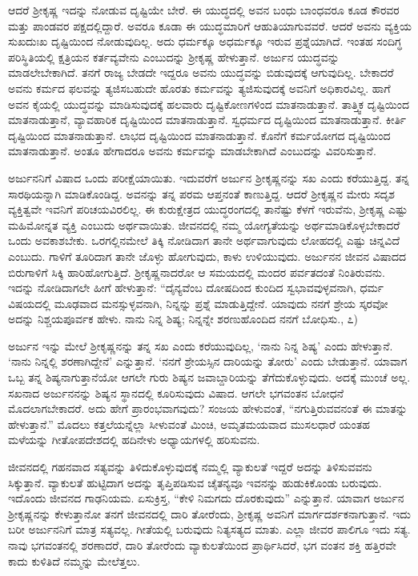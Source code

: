 ಆದರೆ ಶ‍್ರೀಕೃಷ್ಣ ಇದನ್ನು ನೋಡುವ ದೃಷ್ಟಿಯೇ ಬೇರೆ. ಈ ಯುದ್ಧದಲ್ಲಿ ಅವನ ಬಂಧು ಬಾಂಧವರೂ ಕೂಡ ಕೌರವರ ಮತ್ತು ಪಾಂಡವರ ಪಕ್ಷದಲ್ಲಿದ್ದಾರೆ. ಅವರೂ ಕೂಡಾ ಈ ಯುದ್ಧಮಾರಿಗೆ ಆಹುತಿಯಾಗುವವರೆ. ಆದರೆ ಅವನು ವ್ಯಕ್ತಿಯ ಸುಖದುಃಖ ದೃಷ್ಟಿಯಿಂದ ನೋಡುವುದಿಲ್ಲ. ಅದು ಧರ್ಮಕ್ಕೂ ಅಧರ್ಮಕ್ಕೂ ಇರುವ ಪ್ರಶ್ನೆಯಾಗಿದೆ. ಇಂತಹ ಸಂದಿಗ್ಧ ಪರಿಸ್ಥಿತಿಯಲ್ಲಿ ಕ್ಷತ್ರಿಯನ ಕರ್ತವ್ಯವೇನು ಎಂಬುದನ್ನು ಶ‍್ರೀಕೃಷ್ಣ ಹೇಳುತ್ತಾನೆ. ಅರ್ಜುನ ಯುದ್ಧವನ್ನು ಮಾಡಲೇಬೇಕಾಗಿದೆ. ತನಗೆ ರಾಜ್ಯ ಬೇಡದೇ ಇದ್ದರೂ ಅವನು ಯುದ್ಧವನ್ನು ಬಿಡುವುದಕ್ಕೆ ಆಗುವುದಿಲ್ಲ. ಬೇಕಾದರೆ ಅವನು ಕರ್ಮದ ಫಲವನ್ನು ತ್ಯಜಿಸಬಹುದೇ ಹೊರತು ಕರ್ಮವನ್ನು ತ್ಯಜಿಸುವುದಕ್ಕೆ ಅವನಿಗೆ ಅಧಿಕಾರವಿಲ್ಲ. ಹಾಗೆ ಅವನ ಕೈಯಲ್ಲಿ ಯುದ್ಧವನ್ನು ಮಾಡಿಸುವುದಕ್ಕೆ ಹಲವಾರು ದೃಷ್ಟಿಕೋಣಗಳಿಂದ ಮಾತನಾಡುತ್ತಾನೆ. ತಾತ್ತ್ವಿಕ ದೃಷ್ಟಿಯಿಂದ ಮಾತನಾಡುತ್ತಾನೆ, ವ್ಯಾವಹಾರಿಕ ದೃಷ್ಟಿಯಿಂದ ಮಾತನಾಡುತ್ತಾನೆ. ಸ್ವಧರ್ಮದ ದೃಷ್ಟಿಯಿಂದ ಮಾತನಾಡುತ್ತಾನೆ. ಕೀರ್ತಿ ದೃಷ್ಟಿಯಿಂದ ಮಾತನಾಡುತ್ತಾನೆ. ಲಾಭದ ದೃಷ್ಟಿಯಿಂದ ಮಾತನಾಡುತ್ತಾನೆ. ಕೊನೆಗೆ ಕರ್ಮಯೋಗದ ದೃಷ್ಟಿಯಿಂದ ಮಾತನಾಡುತ್ತಾನೆ. ಅಂತೂ ಹೇಗಾದರೂ ಅವನು ಕರ್ಮವನ್ನು ಮಾಡಬೇಕಾಗಿದೆ ಎಂಬುದನ್ನು ವಿವರಿಸುತ್ತಾನೆ.

ಅರ್ಜುನನಿಗೆ ವಿಷಾದ ಒಂದು ಪರೀಕ್ಷೆಯಾಯಿತು. ಇದುವರೆಗೆ ಅರ್ಜುನ ಶ‍್ರೀಕೃಷ್ಣನನ್ನು ಸಖ ಎಂದು ಕರೆಯುತ್ತಿದ್ದ. ತನ್ನ ಸಾರಥಿಯನ್ನಾಗಿ ಮಾಡಿಕೊಂಡಿದ್ದ. ಅವನನ್ನು ತನ್ನ ಪರಮ ಆಪ್ತನಂತೆ ಕಾಣುತ್ತಿದ್ದ. ಆದರೆ ಶ‍್ರೀಕೃಷ್ಣನ ಮೇರು ಸದೃಶ ವ್ಯಕ್ತಿತ್ವವೇ ಇವನಿಗೆ ಪರಿಚಯವಿರಲಿಲ್ಲ. ಈ ಕುರುಕ್ಷೇತ್ರದ ಯುದ್ಧರಂಗದಲ್ಲಿ ತಾನೆಷ್ಟು ಕೆಳಗೆ ಇರುವೆನು, ಶ‍್ರೀಕೃಷ್ಣ ಎಷ್ಟು ಮಹಿಮೋನ್ನತ ವ್ಯಕ್ತಿ ಎಂಬುದು ಅರ್ಥವಾಯಿತು. ಜೀವನದಲ್ಲಿ ನಮ್ಮ ಯೋಗ್ಯತೆಯನ್ನು ಅರ್ಥಮಾಡಿಕೊಳ್ಳಬೇಕಾದರೆ ಒಂದು ಅವಕಾಶಬೇಕು. ಒರಗಲ್ಲಿನಮೇಲೆ ತಿಕ್ಕಿ ನೋಡಿದಾಗ ತಾನೇ ಅರ್ಥವಾಗುವುದು ಲೋಹದಲ್ಲಿ ಎಷ್ಟು ಚಿನ್ನವಿದೆ ಎಂಬುದು. ಗಾಳಿಗೆ ತೂರಿದಾಗ ತಾನೇ ಜೊಳ್ಳು ಹೋಗುವುದು, ಕಾಳು ಉಳಿಯುವುದು. ಅರ್ಜುನನ ಜೀವನ ವಿಷಾದದ ಬಿರುಗಾಳಿಗೆ ಸಿಕ್ಕಿ ಹಾರಿಹೋಗುತ್ತಿದೆ. ಶ‍್ರೀಕೃಷ್ಣನಾದರೋ ಆ ಸಮಯದಲ್ಲಿ ಮಂದರ ಪರ್ವತದಂತೆ ನಿಂತಿರುವನು. ಇದನ್ನು ನೋಡಿದಾಗಲೇ ಹೀಗೆ ಹೇಳುತ್ತಾನೆ: “ದೈನ್ಯವೆಂಬ ದೋಷದಿಂದ ಕುಂದಿದ ಸ್ವಭಾವವುಳ್ಳವನಾಗಿ, ಧರ್ಮ ವಿಷಯದಲ್ಲಿ ಮೂಢವಾದ ಮನಸ್ಸುಳ್ಳವನಾಗಿ, ನಿನ್ನನ್ನು ಪ್ರಶ್ನೆ ಮಾಡುತ್ತಿದ್ದೇನೆ. ಯಾವುದು ನನಗೆ ಶ್ರೇಯ ಸ್ಕರವೋ ಅದನ್ನು ನಿಶ್ಚಯಪೂರ್ವಕ ಹೇಳು. ನಾನು ನಿನ್ನ ಶಿಷ್ಯ; ನಿನ್ನನ್ನೇ ಶರಣುಹೊಂದಿದ ನನಗೆ ಬೋಧಿಸು., ೭)

ಅರ್ಜುನ ಇನ್ನು ಮೇಲೆ ಶ‍್ರೀಕೃಷ್ಣನನ್ನು ತನ್ನ ಸಖ ಎಂದು ಕರೆಯುವುದಿಲ್ಲ, ‘ನಾನು ನಿನ್ನ ಶಿಷ್ಯ’ ಎಂದು ಹೇಳುತ್ತಾನೆ. ‘ನಾನು ನಿನ್ನಲ್ಲಿ ಶರಣಾಗಿದ್ದೇನೆ’ ಎನ್ನುತ್ತಾನೆ. ‘ನನಗೆ ಶ್ರೇಯಸ್ಸಿನ ದಾರಿಯನ್ನು ತೋರು’ ಎಂದು ಬೇಡುತ್ತಾನೆ. ಯಾವಾಗ ಒಬ್ಬ ತನ್ನ ಶಿಷ್ಯನಾಗುತ್ತಾನೆಯೋ ಆಗಲೇ ಗುರು ಶಿಷ್ಯನ ಜವಾಬ್ದಾರಿಯನ್ನು ತೆಗೆದುಕೊಳ್ಳುವುದು. ಅದಕ್ಕೆ ಮುಂಚೆ ಅಲ್ಲ. ಸಖನಾದ ಅರ್ಜುನನನ್ನು ಶಿಷ್ಯನ ಸ್ಥಾನದಲ್ಲಿ ಕೂರಿಸುವುದು ವಿಷಾದ. ಆಗಲೇ ಭಗವಂತನ ಬೋಧನೆ ಮೊದಲಾಗಬೇಕಾದರೆ. ಅದು ಹೇಗೆ ಪ್ರಾರಂಭವಾಗವುದು? ಸಂಜಯ ಹೇಳುವಂತೆ, “ನಗುತ್ತಿರುವವನಂತೆ ಈ ಮಾತನ್ನು ಹೇಳುತ್ತಾನೆ.” ಮೊದಲು ಕತ್ತಲೆಯನ್ನೆಲ್ಲಾ ಸೀಳುವಂತೆ ಮಿಂಚಿ, ಅಮೃತಮಯವಾದ ಮುಸಲಧಾರೆ ಯಂತಹ ಮಳೆಯನ್ನು ಗೀತೋಪದೇಶದಲ್ಲಿ ಹದಿನೇಳು ಅಧ್ಯಾಯಗಳಲ್ಲಿ ಹರಿಸುವನು.

ಜೀವನದಲ್ಲಿ ಗಹನವಾದ ಸತ್ಯವನ್ನು ತಿಳಿದುಕೊಳ್ಳುವುದಕ್ಕೆ ನಮ್ಮಲ್ಲಿ ವ್ಯಾಕುಲತೆ ಇದ್ದರೆ ಅದನ್ನು ತಿಳಿಸುವವನು ಸಿಕ್ಕುತ್ತಾನೆ. ವ್ಯಾಕುಲತೆ ಹುಟ್ಟಿದಾಗ ಅದನ್ನು ತೃಪ್ತಿಪಡಿಸುವ ಚೈತನ್ಯವೂ ಇವನನ್ನು ಹುಡುಕಿಕೊಂಡು ಬರುವುದು. ಇದೊಂದು ಜೀವನದ ಗಾಢನಿಯಮ. ಏಸುಕ್ರಿಸ್ತ, “ಕೇಳಿ ನಿಮಗದು ದೊರಕುವುದು” ಎನ್ನುತ್ತಾನೆ. ಯಾವಾಗ ಅರ್ಜುನ ಶ‍್ರೀಕೃಷ್ಣನನ್ನು ಕೇಳುತ್ತಾನೋ ತನಗೆ ಜೀವನದಲ್ಲಿ ದಾರಿ ತೋರೆಂದು, ಶ‍್ರೀಕೃಷ್ಣ ಅವನಿಗೆ ಮಾರ್ಗದರ್ಶಕನಾಗುತ್ತಾನೆ. ಇದು ಬರೀ ಅರ್ಜುನನಿಗೆ ಮಾತ್ರ ಸತ್ಯವಲ್ಲ. ಗೀತೆಯಲ್ಲಿ ಬರುವುದು ನಿತ್ಯಸತ್ಯದ ಮಾತು. ಎಲ್ಲಾ ಜೀವರ ಪಾಲಿಗೂ ಇದು ಸತ್ಯ. ನಾವು ಭಗವಂತನಲ್ಲಿ ಶರಣಾದರೆ, ದಾರಿ ತೋರೆಂದು ವ್ಯಾಕುಲತೆಯಿಂದ ಪ್ರಾರ್ಥಿಸಿದರೆ, ಭಗ ವಂತನ ಶಕ್ತಿ ಹತ್ತಿರವೇ ಕಾದು ಕುಳಿತಿದೆ ನಮ್ಮನ್ನು ಮೇಲೆತ್ತಲು.


